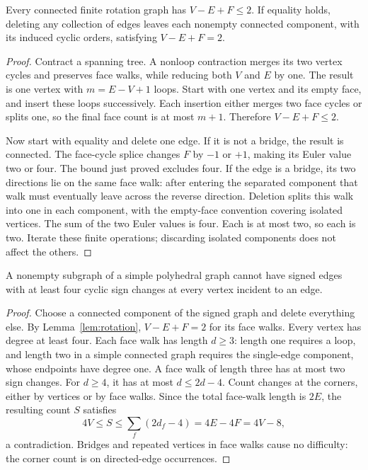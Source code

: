 \begin{lemma}\label{lem:rotation}
Every connected finite rotation graph has $V-E+F\leq2$. If equality
holds, deleting any collection of edges leaves each nonempty connected
component, with its induced cyclic orders, satisfying $V-E+F=2$.
\end{lemma}
\begin{proof}
Contract a spanning tree. A nonloop contraction merges its two vertex
cycles and preserves face walks, while reducing both $V$ and $E$ by
one. The result is one vertex with $m=E-V+1$ loops. Start with one
vertex and its empty face, and insert these loops successively.
Each insertion either merges two face cycles or splits one, so the
final face count is at most $m+1$. Therefore $V-E+F\leq2$.

Now start with equality and delete one edge. If it is not a bridge,
the result is connected. The face-cycle splice changes $F$ by $-1$
or $+1$, making its Euler value two or four. The bound just proved
excludes four. If the edge is a bridge, its two directions lie on
the same face walk: after entering the separated component that walk
must eventually leave across the reverse direction. Deletion splits
this walk into one in each component, with the empty-face convention
covering isolated vertices. The sum of the two Euler values is four.
Each is at most two, so each is two. Iterate these finite operations;
discarding isolated components does not affect the others.
\end{proof}

\begin{lemma}\label{lem:signcount}
A nonempty subgraph of a simple polyhedral graph cannot have signed
edges with at least four cyclic sign changes at every vertex incident
to an edge.
\end{lemma}
\begin{proof}
Choose a connected component of the signed graph and delete everything
else. By Lemma~\ref{lem:rotation}, $V-E+F=2$ for its face walks.
Every vertex has degree at least four. Each face walk has length
$d\geq3$: length one requires a loop, and length two in a simple
connected graph requires the single-edge component, whose endpoints
have degree one. A face walk of length three has at most two sign
changes. For $d\geq4$, it has at most $d\leq2d-4$. Count changes
at the corners, either by vertices or by face walks. Since the total
face-walk length is $2E$, the resulting count $S$ satisfies
\[
 4V\leq S\leq\sum_f(2d_f-4)=4E-4F=4V-8,
\]
a contradiction. Bridges and repeated vertices in face walks cause
no difficulty: the corner count is on directed-edge occurrences.
\end{proof}

